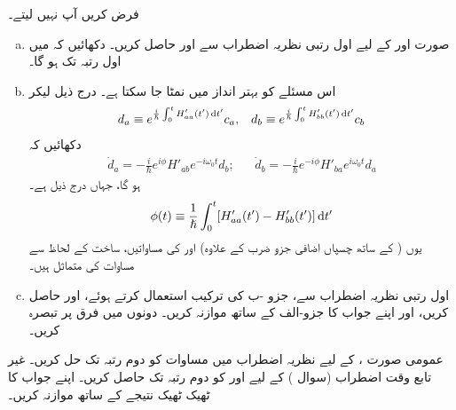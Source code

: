 فرض کریں آپ  نہیں لیتے۔
\begin{enumerate}[a.]
\item
 صورت  اور  کے لیے اول رتبی نظریہ اضطراب سے  اور  حاصل کریں۔ دکھائیں کہ  میں اول رتبہ تک
  ہو گا۔
\item
 اس مسئلے کو بہتر انداز میں نمٹا جا سکتا ہے۔ درج ذیل لیکر
\begin{align}
	d_a\equiv e^{\frac{i}{\hslash}\int_{0}^{t}H'_{aa}(t')\dif t'}c_a,&&d_b\equiv e^{\frac{i}{\hslash}\int_{0}^{t}H'_{bb}(t')\dif t'}c_b
\end{align}
دکھائیں کہ
\begin{align}
	\dot{d}_a=-\frac{i}{\hslash}e^{i\phi}H'_{ab}e^{-i\omega_0t}d_b;&&\dot{d}_b=-\frac{i}{\hslash}e^{-i\phi}H'_{ba}e^{i\omega_0t}d_a
\end{align}
ہو گا، جہاں درج ذیل ہے۔
\begin{align}
	\phi(t)\equiv\frac{1}{\hslash}\int_{0}^{t}[H'_{aa}(t')-H'_{bb}(t')]\dif t'
\end{align}
یوں (  کے ساتھ چسپاں اضافی جزو ضرب  کے علاوہ)  اور  کی مساواتیں، ساخت کے لحاظ سے مساوات  کی متماثل ہیں۔
\item
 اول رتبی نظریہ اضطراب سے، جزو -ب کی ترکیب استعمال کرتے ہوئے،  اور  حاصل کریں، اور اپنے جواب کا جزو-الف کے ساتھ موازنہ کریں۔ دونوں میں فرق پر تبصرہ کریں۔
 \end{enumerate}
عمومی صورت ،  کے لیے نظریہ اضطراب میں مساوات  کو دوم رتبہ تک حل کریں۔
غیر تابع وقت اضطراب (سوال ) کے لیے  اور  کو دوم رتبہ تک حاصل کریں۔ اپنے جواب کا ٹھیک ٹھیک نتیجے کے ساتھ موازنہ کریں۔


